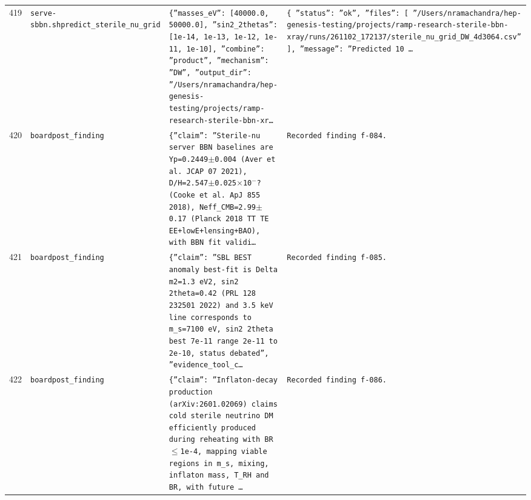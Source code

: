 \documentclass[11pt,a4paper]{article}
\begin{document}
\begin{longtable}{@{}p{}p{}p{}p{}@{}}
419 & \texttt{serve-sbbn.sh}\newline\texttt{predict\_\allowbreak{}sterile\_\allowbreak{}nu\_\allowbreak{}grid} & \texttt{\{''masses\_\allowbreak{}eV'':\allowbreak{} [40000.0,\allowbreak{} 50000.0]\allowbreak{},\allowbreak{} ''sin2\_\allowbreak{}2thetas'':\allowbreak{} [1e-14,\allowbreak{} 1e-13,\allowbreak{} 1e-12,\allowbreak{} 1e-11,\allowbreak{} 1e-10]\allowbreak{},\allowbreak{} ''combine'':\allowbreak{} ''product'',\allowbreak{} ''mechanism'':\allowbreak{} ''DW'',\allowbreak{} ''output\_\allowbreak{}dir'':\allowbreak{} ''/\allowbreak{}Users/\allowbreak{}nramachandra/\allowbreak{}hep-genesis-testing/\allowbreak{}projects/\allowbreak{}ramp-research-sterile-bbn-xr\ldots{}\allowbreak{}} & \texttt{\{   ''status'':\allowbreak{} ''ok'',\allowbreak{}   ''files'':\allowbreak{} [     ''/\allowbreak{}Users/\allowbreak{}nramachandra/\allowbreak{}hep-genesis-testing/\allowbreak{}projects/\allowbreak{}ramp-research-sterile-bbn-xray/\allowbreak{}runs/\allowbreak{}261102\_\allowbreak{}172137/\allowbreak{}sterile\_\allowbreak{}nu\_\allowbreak{}grid\_\allowbreak{}DW\_\allowbreak{}4d3064.csv''   ]\allowbreak{},\allowbreak{}   ''message'':\allowbreak{} ''Predicted 10 \ldots{}\allowbreak{}} \\
420 & \texttt{board}\newline\texttt{post\_\allowbreak{}finding} & \texttt{\{''claim'':\allowbreak{} ''Sterile-nu server BBN baselines are Yp=\allowbreak{}0.2449$\pm$0.004 (Aver et al. JCAP 07 2021)\allowbreak{},\allowbreak{} D/\allowbreak{}H=\allowbreak{}2.547$\pm$0.025$\times$10$^-$? (Cooke et al. ApJ 855 2018)\allowbreak{},\allowbreak{} Neff\_\allowbreak{}CMB=\allowbreak{}2.99$\pm$0.17 (Planck 2018 TT TE EE+lowE+lensing+BAO)\allowbreak{},\allowbreak{} with BBN fit validi\ldots{}\allowbreak{}} & \texttt{Recorded finding f-084.} \\
421 & \texttt{board}\newline\texttt{post\_\allowbreak{}finding} & \texttt{\{''claim'':\allowbreak{} ''SBL BEST anomaly best-fit is Delta m2=\allowbreak{}1.3 eV2,\allowbreak{} sin2 2theta=\allowbreak{}0.42 (PRL 128 232501 2022)\allowbreak{} and 3.5 keV line corresponds to m\_\allowbreak{}s=\allowbreak{}7100 eV,\allowbreak{} sin2 2theta best 7e-11 range 2e-11 to 2e-10,\allowbreak{} status debated'',\allowbreak{} ''evidence\_\allowbreak{}tool\_\allowbreak{}c\ldots{}\allowbreak{}} & \texttt{Recorded finding f-085.} \\
422 & \texttt{board}\newline\texttt{post\_\allowbreak{}finding} & \texttt{\{''claim'':\allowbreak{} ''Inflaton-decay production (arXiv:\allowbreak{}2601.02069)\allowbreak{} claims cold sterile neutrino DM efficiently produced during reheating with BR $\leq$1e-4,\allowbreak{} mapping viable regions in m\_\allowbreak{}s,\allowbreak{} mixing,\allowbreak{} inflaton mass,\allowbreak{} T\_\allowbreak{}RH and BR,\allowbreak{} with future \ldots{}\allowbreak{}} & \texttt{Recorded finding f-086.} \\

\end{longtable}
\end{document}
